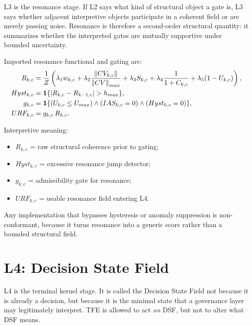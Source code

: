 L3 is the resonance stage. If L2 says what kind of structural object a gate is, L3 says whether adjacent interpretive objects participate in a coherent field or are merely passing noise. Resonance is therefore a second-order structural quantity: it summarizes whether the interpreted gates are mutually supportive under bounded uncertainty.

Imported resonance functional and gating are:
\begin{align*}
R_{k,c} &= \frac{1}{Z}\left(\lambda_1w_{k,c} + \lambda_2\frac{\norm{CV_{k,c}}}{\norm{CV}_{max}} + \lambda_3S_{k,c} + \lambda_4\frac{1}{1+C_{k,c}} + \lambda_5(1-U_{k,c})\right),\\
Hyst_{k,c} &= \mathbf{1}\{|R_{k,c}-R_{k-1,c}|>h_{max}\},\\
g_{k,c} &= \mathbf{1}\{(U_{k,c}\le U_{max})\wedge(IAS_{k,c}=0)\wedge(Hyst_{k,c}=0)\},\\
URF_{k,c} &= g_{k,c}\,R_{k,c}.
\end{align*}

Interpretive meaning:
\begin{itemize}
    \item $R_{k,c}$ = raw structural coherence prior to gating;
    \item $Hyst_{k,c}$ = excessive resonance jump detector;
    \item $g_{k,c}$ = admissibility gate for resonance;
    \item $URF_{k,c}$ = usable resonance field entering L4.
\end{itemize}

Any implementation that bypasses hysteresis or anomaly suppression is non-conformant, because it turns resonance into a generic score rather than a bounded structural field.

\section{L4: Decision State Field}

L4 is the terminal kernel stage. It is called the Decision State Field not because it is already a decision, but because it is the minimal state that a governance layer may legitimately interpret. TFE is allowed to act \emph{on} DSF, but not to alter what DSF means.

